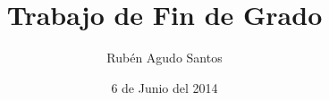 \documentclass[a4paper,12pt]{report}
\begin{document}
\author{Rub\'{e}n Agudo Santos}
\title{Trabajo de Fin de Grado}
\date{6 de Junio del 2014}

\maketitle
\tableofcontents
\newpage
    
   
   
   
   
   
   
   
    
    
    
    
    
    
\end{document}
